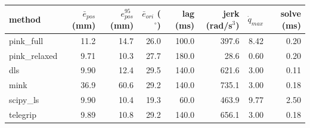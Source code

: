\begin{tabular}{lrrrrrrr}
\toprule
method & $\bar{e}_{pos}$ (mm) & $e_{pos}^{95}$ (mm) & $\bar{e}_{ori}$ ($^\circ$) & lag (ms) & jerk (rad/s$^3$) & $\dot{q}_{max}$ & solve (ms) \\
\midrule
pink\_full & 11.2 & 14.7 & 26.0 & 100.0 & 397.6 & 8.42 & 0.20 \\
pink\_relaxed & 9.71 & 10.3 & 27.7 & 180.0 & 28.6 & 0.60 & 0.20 \\
dls & 9.90 & 12.4 & 29.5 & 140.0 & 621.6 & 3.00 & 0.11 \\
mink & 36.9 & 60.6 & 29.2 & 140.0 & 735.1 & 3.00 & 0.18 \\
scipy\_ls & 9.90 & 10.4 & 19.3 & 60.0 & 463.9 & 9.77 & 2.50 \\
telegrip & 9.89 & 10.8 & 29.2 & 140.0 & 656.1 & 3.00 & 0.18 \\
\bottomrule
\end{tabular}

